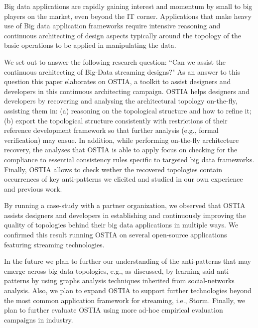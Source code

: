 Big data applications are rapidly gaining interest and momentum by small to big players on the market, even beyond the IT corner. Applications that make heavy use of Big data application frameworks require intensive reasoning and continuous architecting of design aspects typically around the topology of the basic operations to be applied in manipulating the data. 

We set out to answer the following research question: ``Can we assist the continuous architecting of Big-Data streaming designs?" As an answer to this question this paper elaborates on OSTIA, a toolkit to assist designers and developers in this continuous architecting campaign. OSTIA helps designers and developers by recovering and analysing the architectural topology on-the-fly, assisting them in: (a) reasoning on the topological structure and how to refine it; (b) export the topological structure consistently with restrictions of their reference development framework so that further analysis (e.g., formal verification) may ensue. In addition, while performing on-the-fly architecture recovery, the analyses that OSTIA is able to apply focus on checking for the compliance to essential consistency rules specific to targeted big data frameworks. Finally, OSTIA allows to check wether the recovered topologies contain occurrences of key anti-patterns we elicited and studied in our own experience and previous work. 

By running a case-study with a partner organization, we observed that OSTIA assists designers and developers in establishing and continuously improving the quality of topologies behind their big data applications in multiple ways. We confirmed this result running OSTIA on several open-source applications featuring streaming technologies.
 
In the future we plan to further our understanding of the anti-patterns that may emerge across big data topologies, e.g., as discussed, by learning said anti-patterns by using graphs analysis techniques inherited from social-networks analysis. Also, we plan to expand OSTIA to support further technologies beyond the most common application framework for streaming, i.e., Storm. Finally, we plan to further evaluate OSTIA using more ad-hoc empirical evaluation campaigns in industry.